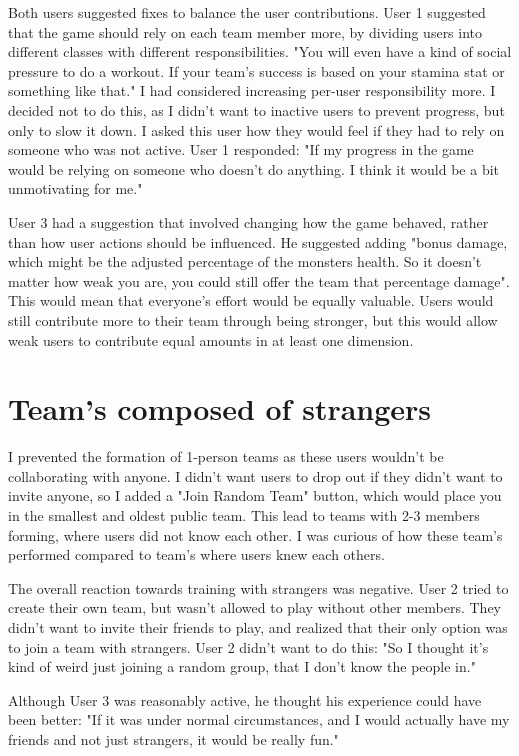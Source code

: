 \documentclass{l4proj}
\begin{document}
Both users suggested fixes to balance the user contributions. User 1 suggested that the game should rely on each team member more, by dividing users into different classes with different responsibilities. "You will even have a kind of social pressure to do a workout. If your team's success is based on your stamina stat or something like that." I had considered increasing per-user responsibility more. I decided not to do this, as I didn't want to inactive users to prevent progress, but only to slow it down. I asked this user how they would feel if they had to rely on someone who was not active. User 1 responded: "If my progress in the game would be relying on someone who doesn't do anything. I think it would be a bit unmotivating for me." 

User 3 had a suggestion that involved changing how the game behaved, rather than how user actions should be influenced. He suggested adding "bonus damage, which might be the adjusted percentage of the monsters health. So it doesn't matter how weak you are, you could still offer the team that percentage damage". This would mean that everyone's effort would be equally valuable. Users would still contribute more to their team through being stronger, but this would allow weak users to contribute equal amounts in at least one dimension. 


\section{Team's composed of strangers}
I prevented the formation of 1-person teams as these users wouldn't be collaborating with anyone. I didn't want users to drop out if they didn't want to invite anyone, so I added a "Join Random Team" button, which would place you in the smallest and oldest public team. This lead to teams with 2-3 members forming, where users did not know each other. I was curious of how these team's performed compared to team's where users knew each others.

The overall reaction towards training with strangers was negative. User 2 tried to create their own team, but wasn't allowed to play without other members. They didn't want to invite their friends to play, and realized that their only option was to join a team with strangers. User 2 didn't want to do this: "So I thought it's kind of weird just joining a random group, that I don't know the people in." 

Although User 3 was reasonably active, he thought his experience could have been better: "If it was under normal circumstances, and I would actually have my friends and not just strangers, it would be really fun." 
\end{document}
